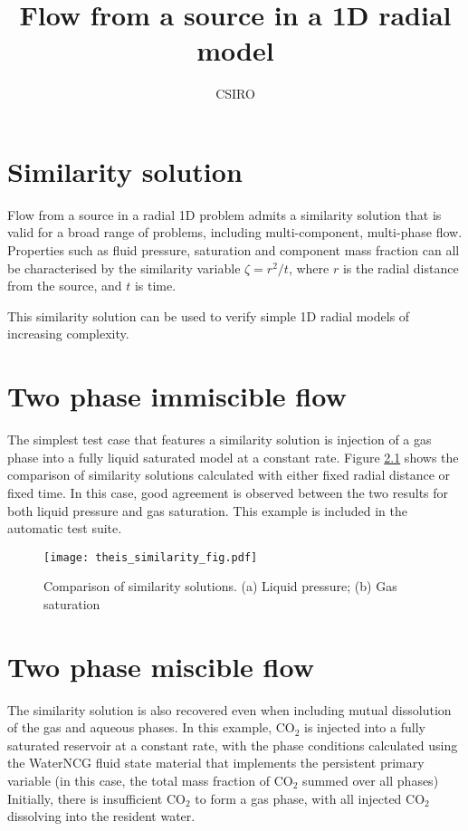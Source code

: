 \documentclass[]{report}
\begin{document}
\title{Flow from a source in a 1D radial model}
\author{CSIRO}
\maketitle

\tableofcontents

\chapter{Similarity solution}

Flow from a source in a radial 1D problem admits a similarity solution that is valid for a
broad range of problems, including multi-component, multi-phase flow. Properties such as fluid
pressure, saturation and component mass fraction can all be characterised by the similarity
variable $\zeta = r^2/t$, where $r$ is the radial distance from the source, and $t$ is time.

This similarity solution can be used to verify simple 1D radial models of increasing complexity.

\chapter{Two phase immiscible flow}

The simplest test case that features a similarity solution is injection of a gas phase into a fully liquid
saturated model at a constant rate. Figure \ref{fig:theis_similarity_fig} shows the comparison of
similarity solutions calculated with either fixed radial distance or fixed time. In this case, good agreement
is observed between the two results for both liquid pressure and gas saturation. This example is included
in the automatic test suite.

\begin{figure}[htb]
\centering
\texttt{[image: theis\_similarity\_fig.pdf]}
\caption{Comparison of similarity solutions. (a) Liquid pressure; (b) Gas saturation}
\label{fig:theis_similarity_fig}
\end{figure}

\chapter{Two phase miscible flow}

The similarity solution is also recovered even when including mutual dissolution of the gas and aqueous
phases. In this example, CO$_2$ is injected into a fully saturated reservoir at a constant rate, with
the phase conditions calculated using the WaterNCG fluid state material that implements the persistent
primary variable (in this case, the total mass fraction of CO$_2$ summed over all phases) Initially, there
is insufficient CO$_2$ to form a gas phase, with all injected CO$_2$ dissolving into the resident water.
\end{document}
